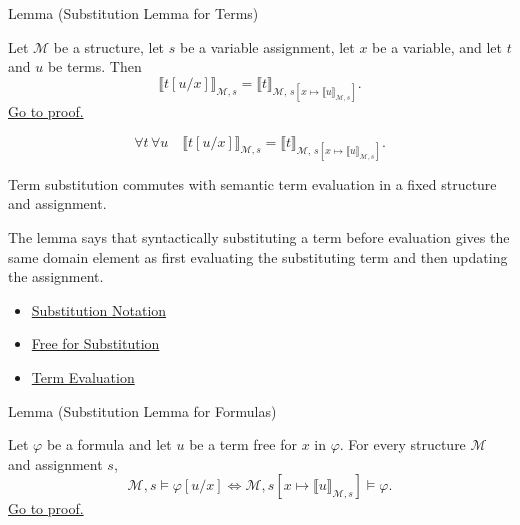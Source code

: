 \begin{lemmabox}{Lemma (Substitution Lemma for Terms)}
\begin{lemma}
\label{lem:subst-terms}
Let \(\mathcal M\) be a structure, let \(s\) be a variable assignment, let
\(x\) be a variable, and let \(t\) and \(u\) be terms. Then
\[
\llbracket t[u/x]\rrbracket_{\mathcal M,s}
=
\llbracket t\rrbracket_{\mathcal M,\,
s[x\mapsto\llbracket u\rrbracket_{\mathcal M,s}]}.
\]
\hyperref[prf:subst-terms]{Go to proof.}
\end{lemma}
\end{lemmabox}

\begin{remark*}
\[
\forall t\,\forall u\quad
\llbracket t[u/x]\rrbracket_{\mathcal M,s}
=
\llbracket t\rrbracket_{\mathcal M,\,
s[x\mapsto\llbracket u\rrbracket_{\mathcal M,s}]}.
\]
\end{remark*}

\begin{remark*}
Term substitution commutes with semantic term evaluation in a fixed structure
and assignment.
\end{remark*}

\begin{remark*}[Interpretation]
The lemma says that syntactically substituting a term before evaluation gives
the same domain element as first evaluating the substituting term and then
updating the assignment.
\end{remark*}

\begin{dependencies}
\begin{itemize}
  \item \hyperref[def:subst-notation]{Substitution Notation}
  \item \hyperref[def:free-for]{Free for Substitution}
  \item \hyperref[def:term-interp]{Term Evaluation}
\end{itemize}
\end{dependencies}

\begin{lemmabox}{Lemma (Substitution Lemma for Formulas)}
\begin{lemma}
\label{lem:subst-formulas}
Let \(\varphi\) be a formula and let \(u\) be a term free for \(x\) in
\(\varphi\). For every structure \(\mathcal M\) and assignment \(s\),
\[
\mathcal M,s\models\varphi[u/x]
\Longleftrightarrow
\mathcal M,s[x\mapsto\llbracket u\rrbracket_{\mathcal M,s}]\models\varphi.
\]
\hyperref[prf:subst-formulas]{Go to proof.}
\end{lemma}
\end{lemmabox}

